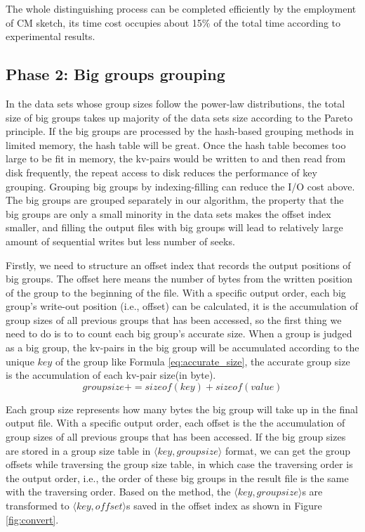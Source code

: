 The whole distinguishing process can be completed efficiently by the employment of CM sketch, its time cost occupies about 15\% of the total time according to experimental results.

\subsection{Phase 2: Big groups grouping}

In the data sets whose group sizes follow the power-law distributions, the total size of big groups takes up majority of the data sets size according to the Pareto principle. If the big groups are processed by the hash-based grouping methods in limited memory, the hash table will be great. Once the hash table becomes too large to be fit in memory, the kv-pairs would be written to and then read from disk frequently, the repeat access to disk reduces the performance of key grouping. Grouping big groups by indexing-filling can reduce the I/O cost above. The big groups are grouped separately in our algorithm, the property that the big groups are only a small minority in the data sets makes the offset index smaller, and filling the output files with big groups will lead to relatively large amount of sequential writes but less number of seeks.

Firstly, we need to structure an offset index that records the output positions of big groups. The offset here means the number of bytes from the written position of the group to the beginning of the file. With a specific output order, each big group's write-out position (i.e., offset) can be calculated, it is the accumulation of group sizes of all previous groups that has been accessed, so the first thing we need to do is to to count each big group's accurate size. When a group is judged as a big group, the kv-pairs in the big group will be accumulated according to the unique $key$ of the group like Formula \ref{eq:accurate_size}, the accurate group size is the accumulation of each kv-pair size(in byte).
\begin{equation}\label{eq:accurate_size}
    groupsize += sizeof(key) + sizeof(value)
\end{equation}

Each group size represents how many bytes the big group will take up in the final output file. With a specific output order, each offset is the
the accumulation of group sizes of all previous groups that has been accessed. If the big group sizes are stored in a group size table in $\langle key, groupsize\rangle$ format, we can get the group offsets while traversing the group size table, in which case the traversing order is the output order, i.e., the order of these big groups in the result file is the same with the traversing order. Based on the method, the $\langle key, groupsize\rangle$s are transformed to $\langle key, offset\rangle$s saved in the offset index as shown in Figure \ref{fig:convert}.

